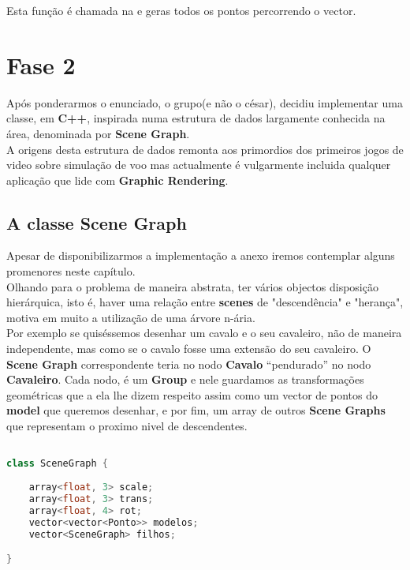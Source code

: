 \documentclass{article}
\begin{document}
Esta função é chamada na  e geras todos os pontos percorrendo o vector.

\newpage

\section{Fase 2}
Após ponderarmos o enunciado, o grupo(e não o césar), decidiu implementar uma classe, em \textbf{C++}, inspirada numa estrutura de dados largamente conhecida na área, denominada por \textbf{Scene Graph}.\\
A origens desta estrutura de dados remonta aos primordios dos primeiros jogos de video sobre simulação de voo mas actualmente é vulgarmente incluida qualquer aplicação que lide com \textbf{Graphic Rendering}.\\

\subsection{A classe Scene Graph}
Apesar de disponibilizarmos a implementação a anexo iremos contemplar alguns promenores neste capítulo.\\
Olhando para o problema de maneira abstrata, ter vários objectos disposição hierárquica, isto é, haver uma relação entre \textbf{scenes} de "descendência" e "herança", motiva em muito a utilização de uma árvore n-ária.\\
Por exemplo se quiséssemos desenhar um cavalo e o seu cavaleiro, não de maneira independente, mas como se o cavalo fosse uma extensão do seu cavaleiro. O \textbf{Scene Graph} correspondente teria no nodo \textbf{Cavalo} “pendurado” no nodo \textbf{Cavaleiro}.
Cada nodo, é um \textbf{Group} e nele guardamos as transformações geométricas que a ela lhe dizem respeito assim como um vector de pontos do \textbf{model} que queremos desenhar, e por fim, um array de outros \textbf{Scene Graphs} que representam o proximo nivel de descendentes.\\

\begin{file}
	\begin{lstlisting}[language=C++]

class SceneGraph {
	
	array<float, 3> scale;
	array<float, 3> trans;
	array<float, 4> rot;
	vector<vector<Ponto>> modelos;
	vector<SceneGraph> filhos;

}

	\end{lstlisting}
\end{file}
\end{document}
